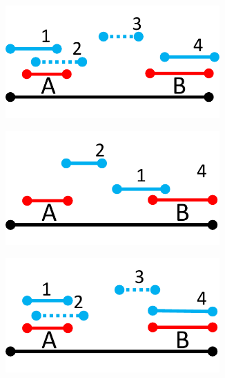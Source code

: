 \documentclass[10pt,journal,compsoc]{IEEEtran}
\begin{document}

%

\begin{figure}[t]
\centering

  \begin{subfigure}[b]{0.18\textwidth}
   	\includegraphics[width=0.9\textwidth]{figures/Matching/HMLC_example.pdf}
    \caption{\label{fig:HMLC_example}}
   \end{subfigure} 
     \begin{subfigure}[b]{0.18\textwidth}
   	\includegraphics[width=0.9\textwidth]{figures/Matching/Tied.pdf}
        \caption{\label{fig:tied}}
   \end{subfigure}
  \begin{subfigure}[b]{0.18\textwidth}
   	\includegraphics[width=0.9\textwidth]{figures/Matching/HMLC_r1.pdf}

\end{subfigure}
\end{figure}
\end{document}
